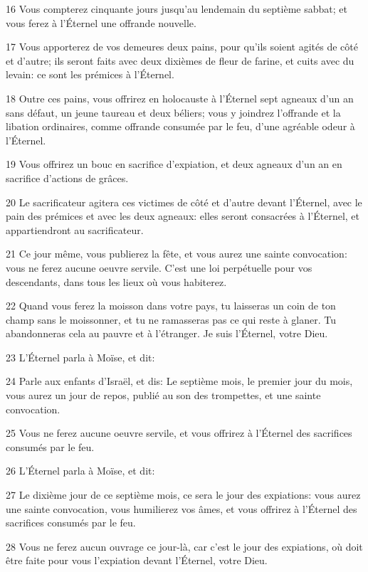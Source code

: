 \par 16 Vous compterez cinquante jours jusqu'au lendemain du septième sabbat; et vous ferez à l'Éternel une offrande nouvelle.
\par 17 Vous apporterez de vos demeures deux pains, pour qu'ils soient agités de côté et d'autre; ils seront faits avec deux dixièmes de fleur de farine, et cuits avec du levain: ce sont les prémices à l'Éternel.
\par 18 Outre ces pains, vous offrirez en holocauste à l'Éternel sept agneaux d'un an sans défaut, un jeune taureau et deux béliers; vous y joindrez l'offrande et la libation ordinaires, comme offrande consumée par le feu, d'une agréable odeur à l'Éternel.
\par 19 Vous offrirez un bouc en sacrifice d'expiation, et deux agneaux d'un an en sacrifice d'actions de grâces.
\par 20 Le sacrificateur agitera ces victimes de côté et d'autre devant l'Éternel, avec le pain des prémices et avec les deux agneaux: elles seront consacrées à l'Éternel, et appartiendront au sacrificateur.
\par 21 Ce jour même, vous publierez la fête, et vous aurez une sainte convocation: vous ne ferez aucune oeuvre servile. C'est une loi perpétuelle pour vos descendants, dans tous les lieux où vous habiterez.
\par 22 Quand vous ferez la moisson dans votre pays, tu laisseras un coin de ton champ sans le moissonner, et tu ne ramasseras pas ce qui reste à glaner. Tu abandonneras cela au pauvre et à l'étranger. Je suis l'Éternel, votre Dieu.
\par 23 L'Éternel parla à Moïse, et dit:
\par 24 Parle aux enfants d'Israël, et dis: Le septième mois, le premier jour du mois, vous aurez un jour de repos, publié au son des trompettes, et une sainte convocation.
\par 25 Vous ne ferez aucune oeuvre servile, et vous offrirez à l'Éternel des sacrifices consumés par le feu.
\par 26 L'Éternel parla à Moïse, et dit:
\par 27 Le dixième jour de ce septième mois, ce sera le jour des expiations: vous aurez une sainte convocation, vous humilierez vos âmes, et vous offrirez à l'Éternel des sacrifices consumés par le feu.
\par 28 Vous ne ferez aucun ouvrage ce jour-là, car c'est le jour des expiations, où doit être faite pour vous l'expiation devant l'Éternel, votre Dieu.
